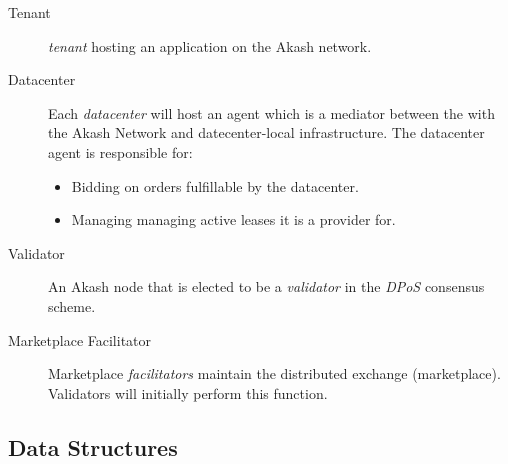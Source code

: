 \documentclass[11pt,english]{article}
\theoremstyle{definition}
\begin{document}
\begin{description}
\item [Tenant] \textit{tenant} hosting an application on the Akash network.
\item [Datacenter] Each \textit{datacenter} will host an agent which is a mediator between the with the Akash Network and datecenter-local infrastructure. The datacenter agent is responsible for:
\begin{itemize}
  \item Bidding on orders fulfillable by the datacenter.
  \item Managing managing active leases it is a provider for.
\end{itemize}
\item [Validator] An Akash node that is elected to be a \textit{validator} in the \textit{DPoS} consensus scheme.
\item [Marketplace Facilitator] Marketplace \textit{facilitators} maintain the distributed exchange (marketplace). Validators will initially perform this function.
\end{description}

\subsection{Data Structures}
\end{document}
